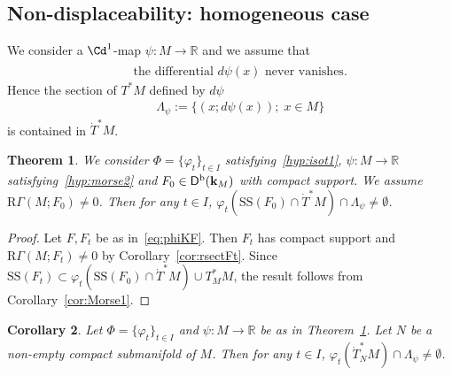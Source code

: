 \documentclass[12pt,leqno]{article}
\newtheorem{theorem}{Theorem}[section]
\newtheorem{corollary}[theorem]{Corollary}
\theoremstyle{definition}
\newcommand{\R}{{\mathbb{R}}}
\def\phi{{\varphi}}
\newcommand{\cor}{{\bf k}}
\renewcommand{\to}[1][]{\xrightarrow[]{#1}}
\newcommand{\rsect}{\mathrm{R}\Gamma}
\newcommand{\eqdot}{\mathbin{:=}}
\newcommand{\cl}{\colon}
\newcommand{\eq}{\begin{eqnarray}}
\newcommand{\eneq}{\end{eqnarray}}
\newcommand{\Der}[1][]{\mathsf{D}^{#1}}
\newcommand{\Derb}{\Der[\mathrm{b}]}
\newcommand{\SSi}{\mathrm{SS}}
\newcommand{\dT}{{\dot{T}}}
\newcommand{\dTM}{{\dT}^*M}
\numberwithin{equation}{section}
\begin{document}
\subsection{Non-displaceability: homogeneous case}
We consider a $\Cd^1$-map $\psi\cl M \to \R$
and we assume that 
\eq\label{hyp:morse2}
&&\mbox{the differential $d\psi(x)$ never vanishes.}
\eneq
Hence  the section of $T^*M$ defined by $d\psi$
\eq
&& \Lambda_\psi \eqdot \{(x;d\psi(x)); \; x\in M\}
\label{eq:lambdapsi}
\eneq
is contained in $\dTM$.
\begin{theorem}\label{th:ndispl1}
We consider $\Phi=\{\phi_t\}_{t\in I}$ satisfying~\eqref{hyp:isot1}, 
$\psi\cl M\to\R$ satisfying~\eqref{hyp:morse2} and
$F_0\in\Derb(\cor_M)$ with compact support. We  assume $\rsect(M;F_0)\not=0$.
Then for any $t\in I$,
$\phi_t(\SSi(F_0)\cap\dTM) \cap \Lambda_\psi \neq \emptyset$.
\end{theorem}
\begin{proof}
Let $F,F_t$ be as in~\eqref{eq:phiKF}. Then $F_t$ has compact support and $\rsect(M;F_t)\not=0$
by Corollary~\ref{cor:rsectFt}.
Since 
$\SSi(F_t) \subset \phi_t(\SSi(F_0)\cap\dTM) \cup T^*_MM$, the result follows from Corollary~\ref{cor:Morse1}.
\end{proof}

\begin{corollary}\label{cor:ndispl1}
Let $\Phi=\{\phi_t\}_{t\in I}$ and $\psi\cl M\to\R$ 
be as in Theorem~\ref{th:ndispl1}.
Let $N$ be a non-empty compact  submanifold of $M$. 
Then for any $t\in I$,
$\phi_t(\dot T^*_NM) \cap \Lambda_\psi \neq \emptyset$.
\end{corollary}
\end{document}
